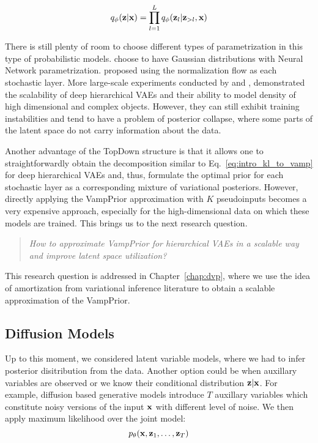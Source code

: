 \begin{equation}
    q_{\phi}({\mathbf{z}}|{\mathbf{x}}) = \prod_{l=1}^L q_{\phi}({\mathbf{z}}_l|{\mathbf{z}}_{>l}, {\mathbf{x}})
\end{equation}


There is still plenty of room to choose different types of parametrization in this type of probabilistic models. 
\citet{sonderby2016ladder} choose to have Gaussian distributions with Neural Network parametrization. 
\citet{kingma2016improved} proposed using the normalization flow as each stochastic layer. 
More large-scale experiments conducted by \citet{vahdat2020nvae} and \citet{Child2020-ze}, demonstrated the scalability of deep hierarchical VAEs and their ability to model density of high dimensional and complex objects.
However, they can still exhibit training instabilities and tend to have a problem of posterior collapse, where some parts of the latent space do not carry information about the data. 

Another advantage of the TopDown structure is that it allows one to straightforwardly obtain the decomposition similar to Eq.~\ref{eq:intro_kl_to_vamp} for deep hierarchical VAEs and, thus, formulate the optimal prior for each stochastic layer as a corresponding mixture of variational posteriors. 
However, directly applying the VampPrior approximation with $K$ pseudoinputs becomes a very expensive approach, especially for the high-dimensional data on which these models are trained. This brings us to the next research question.
\begin{quote}
	\textit{How to approximate VampPrior for hierarchical VAEs in a scalable way and improve latent space utilization?}
\end{quote}
This research question is addressed in Chapter~\ref{chap:dvp}, where we use the idea of amortization from variational inference literature to obtain a scalable approximation of the VampPrior. 

\subsection{Diffusion Models}
Up to this moment, we considered latent variable models, where we had to infer posterior disitribution from the data. Another option could be when auxillary variables are observed or we know their conditional distribution ${\mathbf{z}}|{\mathbf{x}}$. For example, diffusion based generative models introduce $T$ auxillary variables which constitute noisy versions of the input ${\mathbf{x}}$ with different level of noise. We then apply maximum likelihood over the joint model:
\begin{equation}
p_{\theta}({\mathbf{x}}, {\mathbf{z}}_1, \dots, {\mathbf{z}}_T)
\end{equation}

